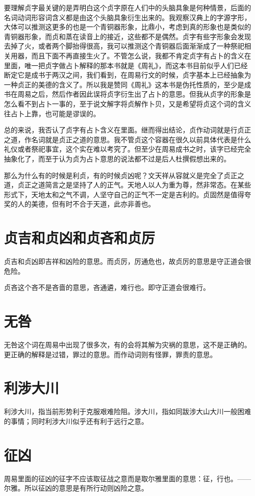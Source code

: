 \documentclass[12pt,oneside]{book}
\begin{document}
要理解贞字最关键的是弄明白这个贞字原在人们中的头脑具象是何种情景，后面的名词动词形容词含义都是由这个头脑具象衍生出来的。我观察汉典上的字源字形，大体可以推测这更多的也是一个青铜器形象，比鼎小，考虑到真的形象也是类似的青铜器形象，而贞和蒸在读音上的接近，这些都不是偶然。贞字有些字形象会发现去掉了火，或者两个脚抬得很高，我可以推测这个青铜器后面渐渐成了一种祭祀相关用器，而且下面不再直接生火了。不管怎么说，我都不肯定贞字有占卜的含义在里面，唯一把贞字做占卜解释的那本书就是《周礼》，而这本书目前似乎人们已经断定它是成书于两汉之间，我们看到，在周易行文的时候，贞字基本上已经抽象为一种贞正的美德的含义了。所以我是赞同《周礼》这本书是伪托性质的，至少是成书在周易之后，然后作者因此误将贞字衍生出了占卜的意思。但我从贞字的形象是怎么看不到占卜一事的，至于说文解字将贞解作卜贝，又是希望将贞这个词的含义往占卜上靠，也可能是谬误的。

总的来说，我否认了贞字有占卜含义在里面。继而得出结论，贞作动词就是行贞正之道，作名词就是贞正之道的意思。我不管贞这个容器在很久以前具体代表是什么礼仪或者祭祀事宜，这个实在难以考究了。但至少在周易成书之时，该字已经完全抽象化了，而至于认为贞为占卜意思的说法都不过是后人杜撰假想出来的。

那么为什么有的时候是利贞，有的时候贞凶呢？文天祥从容就义是完全了贞正之道，贞正之道简言之是坚持了人的正气。天地人以人为重为尊，然非常态。在某些形式下，天地太和之气不调，人坚守自己的正气不一定是吉利的。贞固然是值得夸奖的人的美德，但有时不合于天道，此亦非善也。

\section{贞吉和贞凶和贞吝和贞厉}
贞吉和贞凶即吉祥和凶险的意思。而贞厉，厉通危也，故贞厉的意思是守正道会很危险。

贞吝这个吝不是吝啬的意思，吝通遴，难行也。即守正道会很难行。

\section{无咎}
无咎这个词在周易中出现了很多次，有的会将其解为灾祸的意思，这不是正确的。更正确的解释是过错，罪过的意思。而作动词则有怪罪，罪责的意思。

\section{利涉大川}
利涉大川，指当前形势利于克服艰难险阻。涉大川，指如同跋涉大山大川一般困难的事情；同时利涉大川似乎还有利于远行之意。

\section{征凶}
周易里面的征凶的征字不应该取征战之意而是取尔雅里面的意思：征，行也。——尔雅。所以征凶的意思是有所行动则凶险之意。
\end{document}
